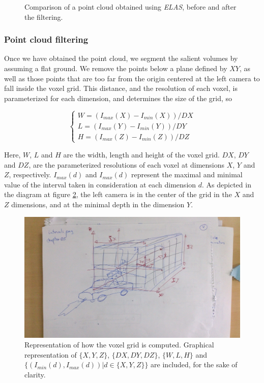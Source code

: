 \begin{figure}[t]
\begin{subfigure}[b]{0.45\textwidth}
        \end{subfigure}%
        \caption{Comparison of a point cloud obtained using \emph{ELAS}, before and after the filtering.}\label{fig:cp05_full_filtered_pointcloud}
\end{figure}

\subsubsection{Point cloud filtering}\label{ch:chapter05_01_01_01}

Once we have obtained the point cloud, we segment the salient volumes by assuming a flat ground. We remove the points below a plane defined by $XY$, as well as those points that are too far from the origin centered at the left camera to fall inside the voxel grid. This distance, and the resolution of each voxel, is parameterized for each dimension, and determines the size of the grid, so

\begin{equation}\label{eq:cp05_filter_limits}
\begin{cases}
W = (I_{max}(X) - I_{min}(X)) / {DX} \\
L = (I_{max}(Y) - I_{min}(Y)) / {DY} \\
H = (I_{max}(Z) - I_{min}(Z)) / {DZ}
\end{cases}
\end{equation}

Here, $W$, $L$ and $H$ are the width, length and height of the voxel grid. $DX$, $DY$ and $DZ$, are the parameterized resolutions of each voxel at dimensions $X$, $Y$ and $Z$, respectively. $I_{max}(d)$ and $I_{max}(d)$ represent the maximal and minimal value of the interval taken in consideration at each dimension $d$. As depicted in the diagram at figure \ref{fig:cp05_intervals}, the left camera is in the center of the grid in the $X$ and $Z$ dimensions, and at the minimal depth in the dimension $Y$.

\begin{figure}[t]
        \centering
        \includegraphics[width=\textwidth]{intervals}
        \caption{Representation of how the voxel grid is computed. Graphical representation of $\{X, Y, Z\}$, $\{DX, DY, DZ\}$, $\{W, L, H\}$ and $\{(I_{min}(d), I_{max}(d))  | d \in \{X, Y, Z\}\}$ are included, for the sake of clarity.}\label{fig:cp05_intervals}
\end{figure}

